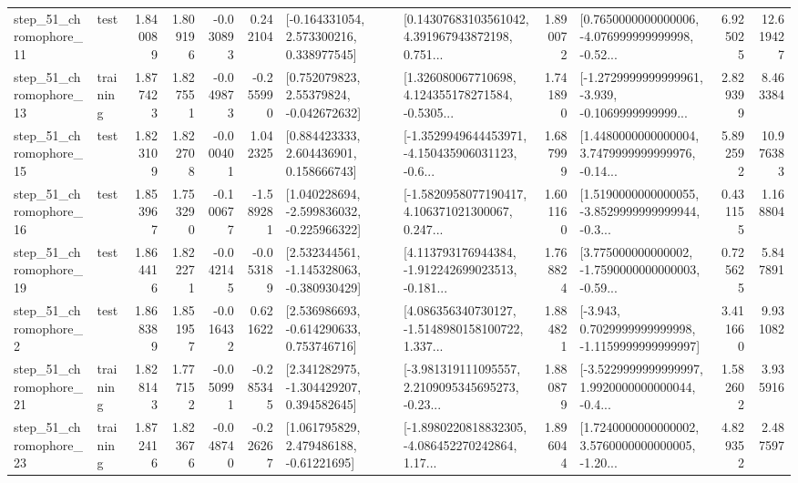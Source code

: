 \begin{tabular}{llrrrrllrlrr}
   step\_51\_chromophore\_11 &      test &      1.840089 &    1.809196 &     -0.030893 &  0.242104 &    [-0.164331054, 2.573300216, 0.338977545] &  [0.14307683103561042, 4.391967943872198, 0.751... &       1.890072 &  [0.7650000000000006, -4.076999999999998, -0.52... &            6.925025 &         12.619427 \\
   step\_51\_chromophore\_13 &  training &      1.877423 &    1.827551 &     -0.049873 & -0.255990 &     [0.752079823, 2.55379824, -0.042672632] &  [1.326080067710698, 4.124355178271584, -0.5305... &       1.741890 &  [-1.2729999999999961, -3.939, -0.1069999999999... &            2.829399 &          8.463384 \\
   step\_51\_chromophore\_15 &      test &      1.823109 &    1.822708 &     -0.000401 &  1.042325 &     [0.884423333, 2.604436901, 0.158666743] &  [-1.3529949644453971, -4.150435906031123, -0.6... &       1.687999 &  [1.4480000000000004, 3.7479999999999976, -0.14... &            5.892592 &         10.976383 \\
   step\_51\_chromophore\_16 &      test &      1.853967 &    1.753290 &     -0.100677 & -1.589281 &   [1.040228694, -2.599836032, -0.225966322] &  [-1.5820958077190417, 4.106371021300067, 0.247... &       1.601160 &  [1.5190000000000055, -3.8529999999999944, -0.3... &            0.431155 &          1.168804 \\
   step\_51\_chromophore\_19 &      test &      1.864416 &    1.822271 &     -0.042145 & -0.053189 &   [2.532344561, -1.145328063, -0.380930429] &  [4.113793176944384, -1.912242699023513, -0.181... &       1.768824 &  [3.775000000000002, -1.7590000000000003, -0.59... &            0.725625 &          5.847891 \\
    step\_51\_chromophore\_2 &      test &      1.868389 &    1.851957 &     -0.016432 &  0.621622 &    [2.536986693, -0.614290633, 0.753746716] &  [4.086356340730127, -1.5148980158100722, 1.337... &       1.884821 &  [-3.943, 0.7029999999999998, -1.1159999999999997] &            3.411660 &          9.931082 \\
   step\_51\_chromophore\_21 &  training &      1.828143 &    1.777152 &     -0.050991 & -0.285345 &    [2.341282975, -1.304429207, 0.394582645] &  [-3.981319111095557, 2.2109095345695273, -0.23... &       1.880879 &  [-3.5229999999999997, 1.9920000000000044, -0.4... &            1.582602 &          3.935916 \\
   step\_51\_chromophore\_23 &  training &      1.872416 &    1.823676 &     -0.048740 & -0.226267 &     [1.061795829, 2.479486188, -0.61221695] &  [-1.8980220818832305, -4.086452270242864, 1.17... &       1.896044 &  [1.7240000000000002, 3.5760000000000005, -1.20... &            4.829352 &          2.487597 \\

\end{tabular}
